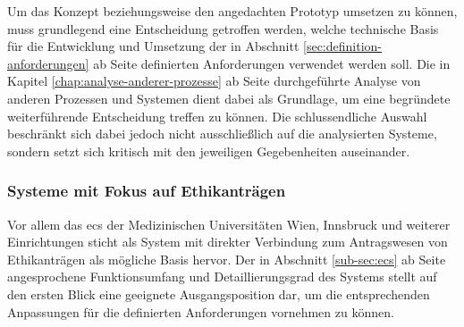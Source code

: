 \documentclass[a4paper,12pt,twoside,numbers=noendperiod]{scrreprt}
\begin{document}
Um das Konzept beziehungsweise den angedachten Prototyp umsetzen zu können, muss grundlegend eine Entscheidung getroffen werden, welche technische Basis für die Entwicklung und Umsetzung der in Abschnitt \ref{sec:definition-anforderungen} ab Seite \pageref{sec:definition-anforderungen} definierten Anforderungen verwendet werden soll. Die in Kapitel \ref{chap:analyse-anderer-prozesse} ab Seite \pageref{chap:analyse-anderer-prozesse} durchgeführte Analyse von anderen Prozessen und Systemen dient dabei als Grundlage, um eine begründete weiterführende Entscheidung treffen zu können. Die schlussendliche Auswahl beschränkt sich dabei jedoch nicht ausschließlich auf die analysierten Systeme, sondern setzt sich kritisch mit den jeweiligen Gegebenheiten auseinander.

\subsubsection*{Systeme mit Fokus auf Ethikanträgen}
\label{sub-sub-sec:technische-basis-fokus-ethikanträge}

Vor allem das \acl{ecs} der Medizinischen Universitäten Wien, Innsbruck und weiterer Einrichtungen sticht als System mit direkter Verbindung zum Antragswesen von Ethikanträgen als mögliche Basis hervor. Der in Abschnitt \ref{sub-sec:ecs} ab Seite \pageref{sub-sec:ecs} angesprochene Funktionsumfang und Detaillierungsgrad des Systems stellt auf den ersten Blick eine geeignete Ausgangsposition dar, um die entsprechenden Anpassungen für die definierten Anforderungen vornehmen zu können.
\end{document}
